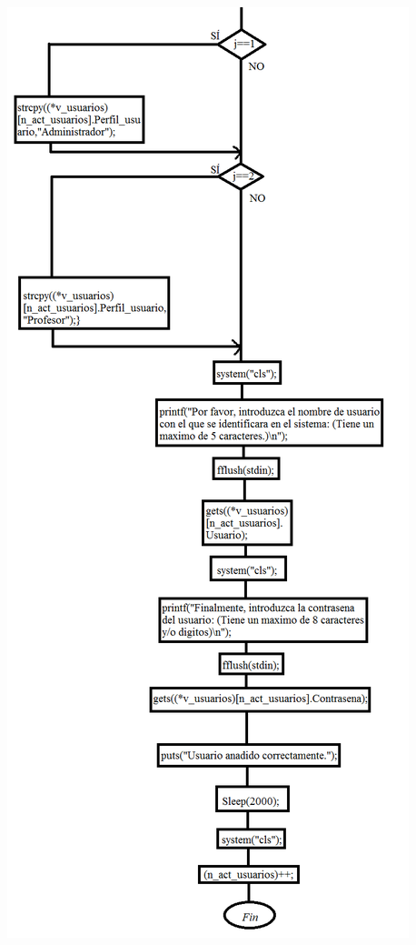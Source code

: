 \documentclass{book}
\begin{document}
\begin{center}
\includegraphics[scale=0.45]{CDF2.png}
\end{center}
\newpage
\end{document}
